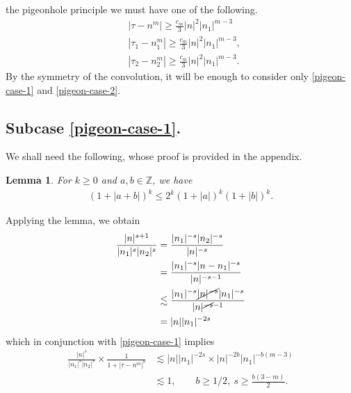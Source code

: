 \documentclass[12pt,reqno]{amsart}
\numberwithin{equation}{section}  %
\numberwithin{figure}{section}
\newcommand{\zz}{\mathbb{Z}}
\theoremstyle{plain}
\newtheorem{lemma}{Lemma}
\theoremstyle{definition}
\theoremstyle{remark}
\begin{document}
the pigeonhole principle we must have one of the 
following.
%
%
\begin{align}
	\label{pigeon-case-1}
	& |\tau - n^{m }| \ge \frac{c_m}{3} |n|^2 | n_1 |^{m-3} 		\\
		\label{pigeon-case-2}
	    & | \tau_1 - n_1^{m } | \ge \frac{c_m}{3} |n|^2 | n_1 |^{m-3} ,  
		\\
		\label{pigeon-case-3}
		& | \tau_2 - n_2^{m } | \ge
		\frac{c_m}{3} |n|^2 | n_1 |^{m-3}.  
\end{align}
%
%
By the symmetry of the convolution, it will be enough to consider only
\eqref{pigeon-case-1} and \eqref{pigeon-case-2}.
%
%
%
\subsection{Subcase \eqref{pigeon-case-1}.} 
We shall need the following, whose proof is provided in the appendix.
%
%
\begin{lemma}
\label{lem:splitting}
	For $k \ge 0$ and $a, b \in {\zz}$, we have
%
%
\begin{equation}
	\label{splitting}
	\begin{split}
		\left ( 1 + |a +b | \right)^k \le 2^k \left(1 + | a | \right)^k \left(
		1 + | b | \right)^k.
	\end{split}
\end{equation}
%
%
\end{lemma}
%
Applying the lemma, we obtain
%
%
%
\begin{equation*}
	\begin{split}
		\frac{|n|^{s+1}}{|n_1|^s | n_2|^s } 
		& =\frac{|n_1|^{-s} |n_2|^{-s}
		}{|n|^{-s}}
		\\
		& = \frac{| n_1|^{-s} | n - n_1 |^{-s} }{ | n|^{-s-1}} 
		\\
		& \lesssim \frac{|n_1|^{-s} \cancel{|n|^{-s} }|n_1 |
		^{-s}}{ |n|
		^{\cancel{-s}-1}}
		\\
		& = |n| | n_1 |^{-2s}
	\end{split}
\end{equation*}
%
which in conjunction with \eqref{pigeon-case-1} implies
%
\begin{equation}
	\label{convo-deriv-bound}
	\begin{split}
		\frac{|n|^s}{|n_1|^s 
		| n_2|^s}
		\times
		\frac{1}{1 + | \tau -n^{m} |^{b}}
		& \lesssim  |n| |n_{1} |^{-2s} \times |n|^{-2b} |n_{1}|^{-b(m-3)} 
		\\
		& \lesssim 1, \qquad b\ge 1/2, \ s \ge \frac{b(3-m)}{2}.
	\end{split}  
\end{equation}
\end{document}
